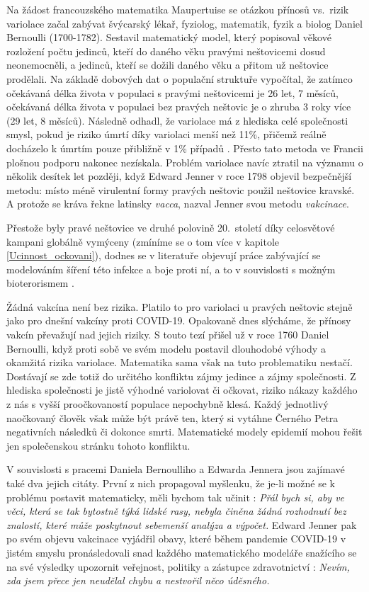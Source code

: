 Na žádost francouzského matematika Maupertuise se otázkou přínosů vs.\ rizik variolace začal zabývat švýcarský lékař, fyziolog, matematik, fyzik a biolog Daniel Bernoulli (1700-1782). Sestavil matematický model, který popisoval věkové rozložení počtu jedinců, kteří do daného věku pravými neštovicemi dosud neonemocněli, a jedinců, kteří se dožili daného věku a přitom už neštovice prodělali. Na základě dobových dat o populační struktuře vypočítal, že zatímco očekávaná délka života v populaci s pravými neštovicemi je 26 let, 7 měsíců, očekávaná délka života v populaci bez pravých neštovic je o zhruba 3 roky více (29 let, 8 měsíců). Následně odhadl, že variolace má z hlediska celé společnosti smysl, pokud je riziko úmrtí díky variolaci menší než 11\%, přičemž reálně docházelo k úmrtím pouze přibližně v 1\% případů \cite{Bacaer2011}. Přesto tato metoda ve Francii plošnou podporu nakonec nezískala. Problém variolace navíc ztratil na významu o několik desítek let později, když Edward Jenner v roce 1798 objevil bezpečnější metodu: místo méně virulentní formy pravých neštovic použil neštovice kravské. A protože se kráva řekne latinsky \emph{vacca}, nazval Jenner svou metodu \emph{vakcinace}. 

Přestože byly pravé neštovice ve druhé polovině 20.\ století díky celosvětové kampani globálně vymýceny (zmíníme se o tom více v kapitole \ref{Ucinnost_ockovani}), dodnes se v literatuře objevují práce zabývající se modelováním šíření této infekce a boje proti ní, a to v souvislosti s možným bioterorismem \cite{Bozzette_etal2003,Longini_etal2007}.

Žádná vakcína není bez rizika. Platilo to pro variolaci u pravých neštovic stejně jako pro dnešní vakcíny proti COVID-19. Opakovaně dnes slýcháme, že přínosy vakcín převažují nad jejich riziky. S touto tezí přišel už v roce 1760 Daniel Bernoulli, když proti sobě ve svém modelu postavil dlouhodobé výhody a okamžitá rizika variolace. Matematika sama však na tuto problematiku nestačí. Dostávají se zde totiž do určitého konfliktu zájmy jedince a zájmy společnosti. Z hlediska společnosti je jistě výhodné variolovat či očkovat, riziko nákazy každého z nás s vyšší proočkovaností populace nepochybně klesá. Každý jednotlivý naočkovaný člověk však může být právě ten, který si vytáhne Černého Petra negativních následků či dokonce smrti. Matematické modely epidemií mohou řešit jen společenskou stránku tohoto konfliktu.

V souvislosti s pracemi Daniela Bernoulliho a Edwarda Jennera jsou zajímavé také dva jejich citáty. První z nich propagoval myšlenku, že je-li možné se k problému postavit matematicky, měli bychom tak učinit \cite{Bacaer2011}: \emph{Přál bych si, aby ve věci, která se tak bytostně týká lidské rasy, nebyla činěna žádná rozhodnutí bez znalostí, které může poskytnout sebemenší analýza a výpočet.} Edward Jenner pak po svém objevu vakcinace vyjádřil obavy, které během pandemie COVID-19 v jistém smyslu pronásledovali snad každého matematického modeláře snažícího se na své výsledky upozornit veřejnost, politiky a zástupce zdravotnictví \cite{JennerCitat}: \emph{Nevím, zda jsem přece jen neudělal chybu a nestvořil něco úděsného.}

